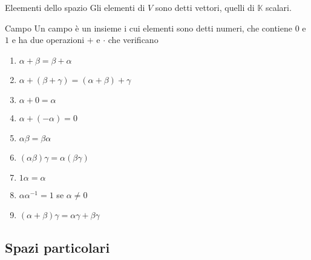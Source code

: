 \begin{Def}{Eleementi dello spazio}
  Gli elementi di $V$ sono detti vettori, quelli di $\mathbb{K}$ scalari.
\end{Def}

\begin{Def}{Campo}
  Un campo è un insieme i cui elementi sono detti numeri, che contiene $0$ e $1$ e ha
  due operazioni $+$ e $\cdot$ che verificano
  \begin{multicols}{2}
    \begin{enumerate}
      \item $\alpha+\beta = \beta+\alpha$
      \item $\alpha+(\beta+\gamma) = (\alpha+\beta)+\gamma$
      \item $\alpha+0 = \alpha$
      \item $\alpha+(-\alpha)=0$
      \columnbreak%
      \item $\alpha\beta = \beta\alpha$
      \item $(\alpha\beta)\gamma = \alpha(\beta\gamma)$
      \item $1\alpha = \alpha$
      \item $\alpha\alpha^{-1}=1$ se $\alpha\neq0$
      \item $(\alpha+\beta)\gamma = \alpha\gamma+\beta\gamma$
    \end{enumerate}
  \end{multicols}
\end{Def}

\subsection{Spazi particolari}%
\label{sub:spazi_particolari}

